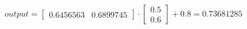 \documentclass[convert={density=1000,size=1000,outext=.png,border=1pt}]{standalone}
\begin{document}
\[
output =
\begin{bmatrix}
{0.6456563} & {0.6899745}
\end{bmatrix}
\cdot
\begin{bmatrix}
{0.5} \\
{0.6}
\end{bmatrix}
+
{0.8}
=
0.73681285
\]

\medskip
\end{document}
